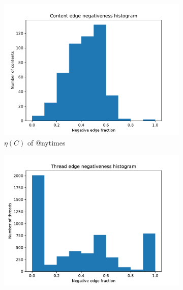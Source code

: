 

\begin{figure}
	\begin{center}
		\begin{subfigure}[b]{0.4\textwidth}
			\centering
			\includegraphics[width=\textwidth]{tex/out/nytimes700/neg-fraction-content-hist.pdf}
			\caption{$\eta(C)$ of @nytimes}
			\label{fig:nytimes-content-eta}
		\end{subfigure}
		\begin{subfigure}[b]{0.4\textwidth}
			\centering
			\includegraphics[width=\textwidth]{tex/out/nytimes700/neg-fraction-thread-hist.pdf}

\end{subfigure}
\end{center}
\end{figure}
